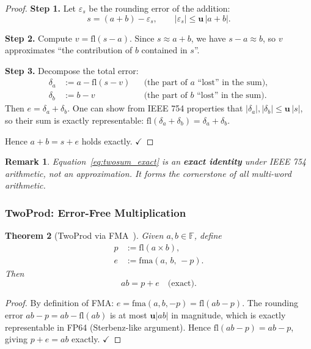 \documentclass[12pt,a4paper]{article}
\newtheorem{theorem}{Theorem}[section]
\newtheorem{remark}[theorem]{Remark}
\newcommand{\fl}{\mathrm{fl}}
\newcommand{\uu}{\mathbf{u}}
\newcommand{\FF}{\mathbb{F}}
\begin{document}
\begin{proof}
\textbf{Step 1.}
Let $\varepsilon_s$ be the rounding error of the addition:
\begin{equation}
  s = (a + b) - \varepsilon_s, \qquad |\varepsilon_s| \leq \uu\,|a + b|.
\end{equation}

\textbf{Step 2.}
Compute $v = \fl(s - a)$.
Since $s \approx a + b$, we have $s - a \approx b$, so $v$ approximates
``the contribution of $b$ contained in $s$''.

\textbf{Step 3.}
Decompose the total error:
\begin{align}
  \delta_a &:= a - \fl(s - v)
    & &\text{(the part of $a$ ``lost'' in the sum)}, \\
  \delta_b &:= b - v
    & &\text{(the part of $b$ ``lost'' in the sum)}.
\end{align}
Then $e = \delta_a + \delta_b$.
One can show from IEEE 754 properties that $|\delta_a|, |\delta_b| \leq \uu\,|s|$,
so their sum is exactly representable:
$\fl(\delta_a + \delta_b) = \delta_a + \delta_b$.

Hence $a + b = s + e$ holds exactly. \qquad $\checkmark$
\end{proof}

\begin{remark}
Equation~\eqref{eq:twosum_exact} is an \textbf{exact identity} under IEEE 754
arithmetic, not an approximation.
It forms the cornerstone of all multi-word arithmetic.
\end{remark}

\subsubsection{TwoProd: Error-Free Multiplication}

\begin{theorem}[TwoProd via FMA~\cite{Dekker1971}]
\label{thm:twoprod}
Given $a, b \in \FF$, define
\begin{align}
  p &:= \fl(a \times b), \\
  e &:= \mathrm{fma}(a,\, b,\, -p).
\end{align}
Then
\begin{equation}
  ab = p + e \quad \text{(exact)}.
  \label{eq:twoprod_exact}
\end{equation}
\end{theorem}

\begin{proof}
By definition of FMA:
$e = \mathrm{fma}(a, b, -p) = \fl(ab - p)$.
The rounding error $ab - p = ab - \fl(ab)$ is at most $\uu|ab|$ in magnitude,
which is exactly representable in FP64 (Sterbenz-like argument).
Hence $\fl(ab - p) = ab - p$, giving $p + e = ab$ exactly. \qquad $\checkmark$
\end{proof}
\end{document}
